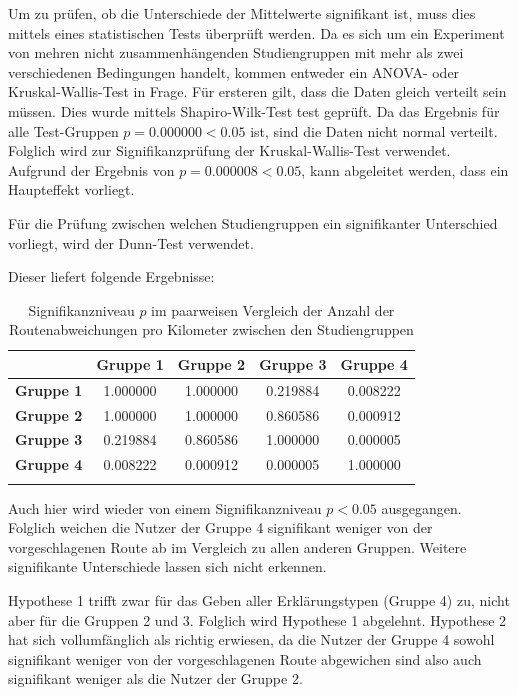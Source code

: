 Um zu prüfen, ob die Unterschiede der Mittelwerte signifikant ist, muss dies mittels eines statistischen Tests überprüft werden. Da es sich um ein Experiment von mehren nicht zusammenhängenden Studiengruppen mit mehr als zwei verschiedenen Bedingungen handelt, kommen entweder ein ANOVA- oder Kruskal-Wallis-Test in Frage. Für ersteren gilt, dass die Daten gleich verteilt sein müssen. Dies wurde mittels Shapiro-Wilk-Test test geprüft. Da das Ergebnis für alle Test-Gruppen $ p = 0.000000 < 0.05 $ ist, sind die Daten nicht normal verteilt. Folglich wird zur Signifikanzprüfung der Kruskal-Wallis-Test verwendet. Aufgrund der Ergebnis von $ p = 0.000008 < 0.05 $, kann abgeleitet werden, dass ein Haupteffekt vorliegt.

Für die Prüfung zwischen welchen Studiengruppen ein signifikanter Unterschied vorliegt, wird der Dunn-Test \cite{dunn1964multiple} verwendet.

Dieser liefert folgende Ergebnisse:

\begin{longtable}{|c|c|c|c|c|}
    \hline
    & \textbf{Gruppe 1} & \textbf{Gruppe 2} & \textbf{Gruppe 3} & \textbf{Gruppe 4} \\ \hline
    \textbf{Gruppe 1}   & 1.000000 & 1.000000 & 0.219884 & 0.008222 \\ \hline
    \textbf{Gruppe 2}   & 1.000000 & 1.000000 & 0.860586 & 0.000912 \\ \hline
    \textbf{Gruppe 3}   & 0.219884 & 0.860586 & 1.000000 & 0.000005 \\ \hline
    \textbf{Gruppe 4}   & 0.008222 & 0.000912 & 0.000005 & 1.000000 \\ \hline

    \caption{Signifikanzniveau $ p $ im paarweisen Vergleich der Anzahl der Routenabweichungen pro Kilometer zwischen den Studiengruppen }
    \label{tab:study_offroute_significance_results}
\end{longtable}

Auch hier wird wieder von einem Signifikanzniveau $ p < 0.05 $ ausgegangen. Folglich weichen die Nutzer der Gruppe 4 signifikant weniger von der vorgeschlagenen Route ab im Vergleich zu allen anderen Gruppen. Weitere signifikante Unterschiede lassen sich nicht erkennen.

Hypothese 1 trifft zwar für das Geben aller Erklärungstypen (Gruppe 4) zu, nicht aber für die Gruppen 2 und 3. Folglich wird Hypothese 1 abgelehnt.  Hypothese 2 hat sich vollumfänglich als richtig erwiesen, da die Nutzer der Gruppe 4 sowohl signifikant weniger von der vorgeschlagenen Route abgewichen sind also auch signifikant weniger als die Nutzer der Gruppe 2.

